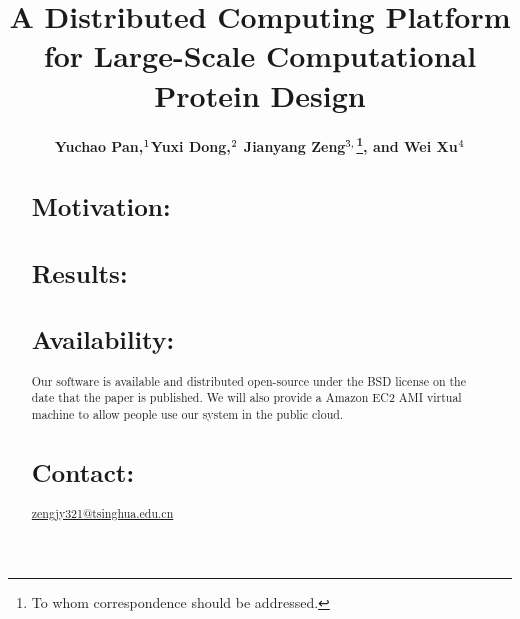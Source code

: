 \documentclass[singlecolumdfsn]{bioinfo}
\begin{document}
\title[A Distributed Computing Platform for Large-Scale Computational Protein Design]{A Distributed Computing Platform for Large-Scale Computational Protein Design}
\author[Y. Pan and Y. Dong]{\bf Yuchao Pan,$^{\rm 1}$Yuxi Dong,$^{\rm 2}$ Jianyang Zeng$^{\rm 3,}$\footnote{To whom correspondence should be addressed.}, and Wei Xu$^{\rm 4}$}
%
\address{$^{\rm 1}$, $^{\rm 2}$, $^{\rm 3}$ and $^{\rm 4}$}

\history{}

\editor{}
%
\maketitle

%




\begin{abstract}
\section{Motivation:}

\section{Results:}

\section{Availability:} Our software is available and distributed open-source
under the BSD license on the date that the paper is published.
We will also provide a Amazon EC2 AMI virtual machine
to allow people use our system in the public cloud.

\section{Contact:} \href{zengjy321@tsinghua.edu.cn}{zengjy321@tsinghua.edu.cn}

\end{abstract}


\vspace{-10pt}
\end{document}
